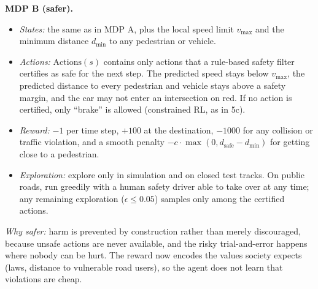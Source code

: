 \begin{solution}
\textbf{MDP B (safer).}
\begin{itemize}[nosep]
  \item \emph{States:} the same as in MDP A, plus the local speed limit $v_{\max}$ and the minimum distance $d_{\min}$
        to any pedestrian or vehicle.
  \item \emph{Actions:} $\text{Actions}(s)$ contains only actions that a rule-based safety filter certifies as safe
        for the next step. The predicted speed stays below $v_{\max}$, the predicted distance to every pedestrian
        and vehicle stays above a safety margin, and the car may not enter an intersection on red. If no action is
        certified, only ``brake'' is allowed (constrained RL, as in 5c).
  \item \emph{Reward:} $-1$ per time step, $+100$ at the destination, $-1000$ for any collision or traffic violation, and
        a smooth penalty $-c\cdot\max(0, d_{\text{safe}}-d_{\min})$ for getting close to a pedestrian.
  \item \emph{Exploration:} explore only in simulation and on closed test tracks. On public roads, run greedily with
        a human safety driver able to take over at any time; any remaining exploration ($\epsilon\le0.05$) samples
        only among the certified actions.
\end{itemize}
\emph{Why safer:} harm is prevented by construction rather than merely discouraged, because unsafe actions are never
available, and the risky trial-and-error happens where nobody can be hurt. The reward now encodes the values society
expects (laws, distance to vulnerable road users), so the agent does not learn that violations are cheap.
\end{solution}

